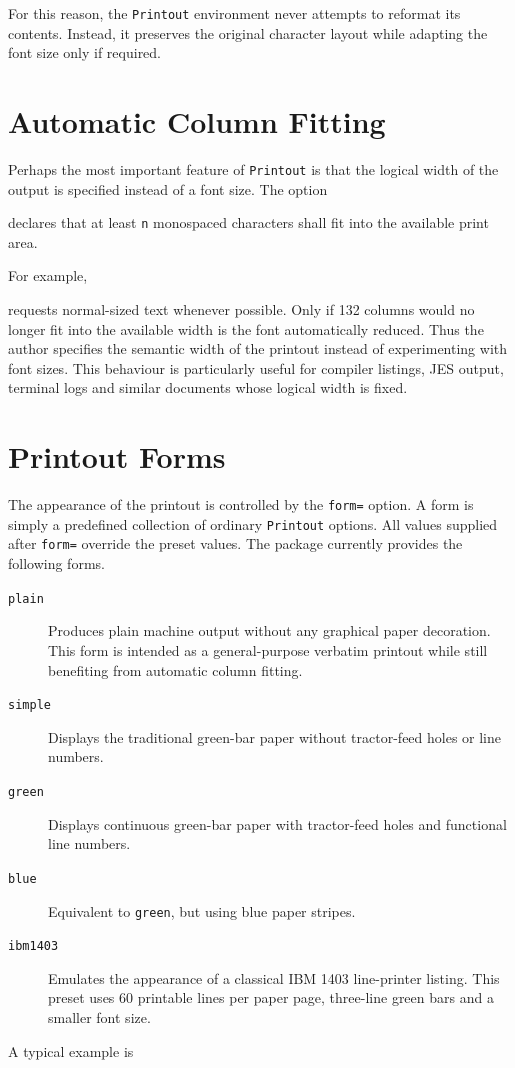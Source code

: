 \documentclass[
11pt,
a4paper,
oneside
]{scrbook}
\begin{document}
For this reason, the \texttt{Printout} environment never attempts to
reformat its contents. Instead, it preserves the original character
layout while adapting the font size only if required.

\section{Automatic Column Fitting}

Perhaps the most important feature of \texttt{Printout} is that the
logical width of the output is specified instead of a font size.
The option




declares that at least \texttt{n} monospaced characters shall fit into
the available print area.

\noindent For example,




requests normal-sized text whenever possible.
Only if 132 columns would no longer fit into the available width is the
font automatically reduced.
Thus the author specifies the semantic width of the printout instead of
experimenting with font sizes.
This behaviour is particularly useful for compiler listings, JES output,
terminal logs and similar documents whose logical width is fixed.

\section{Printout Forms}

The appearance of the printout is controlled by the
\texttt{form=} option.
A form is simply a predefined collection of ordinary
\texttt{Printout} options.
All values supplied after \texttt{form=} override the preset values.
The package currently provides the following forms.
\begin{description}
	\item[\texttt{plain}]
	Produces plain machine output without any graphical paper decoration.
	This form is intended as a general-purpose verbatim printout while still
	benefiting from automatic column fitting.
	
	\item[\texttt{simple}]
	Displays the traditional green-bar paper without tractor-feed holes or
	line numbers.

	\item[\texttt{green}]
	Displays continuous green-bar paper with tractor-feed holes and
	functional line numbers.
	
	\item[\texttt{blue}]
	Equivalent to \texttt{green}, but using blue paper stripes.
	
	\item[\texttt{ibm1403}]
	Emulates the appearance of a classical IBM 1403 line-printer listing.
	This preset uses 60 printable lines per paper page, three-line green
	bars and a smaller font size.
\end{description}
A typical example is
\end{document}
